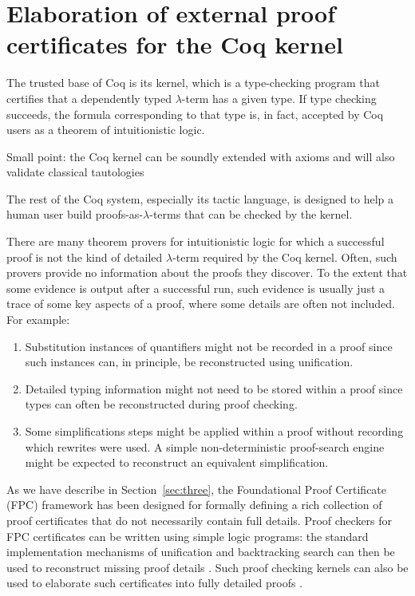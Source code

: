 \section{Elaboration of external proof certificates for the Coq
  kernel}


The trusted base of Coq is its kernel, which is a type-checking
program that certifies that a dependently typed $\lambda$-term has a
given type.  If type checking succeeds, the formula corresponding to
that type is, in fact, accepted by Coq users as a theorem of
intuitionistic logic.
\begin{metanote}
  Small point: the Coq kernel can be soundly extended with axioms and will also validate classical tautologies
\end{metanote}
The rest of the Coq system, especially its
tactic language, is designed to help a human user build
proofs-as-$\lambda$-terms that can be checked by the kernel.

There are many theorem provers for intuitionistic logic
\cite{raths07jar} for which a successful proof is not the kind of
detailed $\lambda$-term required by the Coq kernel.  Often, such
provers provide no information about the proofs they discover.  To the
extent that some  evidence is output after a successful run, such
evidence is usually just a trace of some key aspects of a proof, where some
details are often not included.  For example:
\begin{enumerate}

\item Substitution instances of quantifiers might not be recorded in a
  proof since such instances can, in principle, be reconstructed using
  unification.

\item Detailed typing information might not need to be stored within a
  proof since types can often be reconstructed during proof checking.

\item Some simplifications steps might be applied within a proof
  without recording which rewrites were used.  A simple 
  non-deterministic proof-search engine might be expected to
  reconstruct an equivalent simplification.
\end{enumerate}

As we have describe in Section~\ref{sec:three}, the Foundational Proof
Certificate (FPC) framework has been designed for formally defining a
rich collection of proof certificates that do not necessarily contain
full details.  Proof checkers for FPC certificates can be written
using simple logic programs: the standard implementation mechanisms of
unification and backtracking search can then be used to reconstruct
missing proof details \cite{miller17fac}.  Such proof checking kernels
can also be used to elaborate such certificates into fully detailed
proofs \cite{blanco17phd,blanco17cade}.

